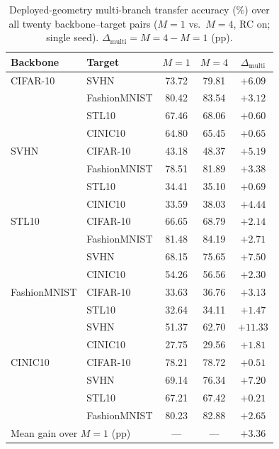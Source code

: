 \documentclass[conference]{IEEEtran}
\begin{document}
\begin{table}[!t]
\centering
\caption{Deployed-geometry multi-branch transfer accuracy (\%) over all twenty backbone--target pairs ($M{=}1$ vs.\ $M{=}4$, RC on; single seed). $\Delta_{\text{multi}} = M{=}4 - M{=}1$ (pp).}
\label{tab:mbdep}
\small
\setlength{\tabcolsep}{5pt}
\begin{tabular}{llccc}
\toprule
\textbf{Backbone} & \textbf{Target} & $M{=}1$ & $M{=}4$ & $\Delta_{\text{multi}}$ \\
\midrule
CIFAR-10 & SVHN & 73.72 & 79.81 & $+6.09$ \\
 & FashionMNIST & 80.42 & 83.54 & $+3.12$ \\
 & STL10 & 67.46 & 68.06 & $+0.60$ \\
 & CINIC10 & 64.80 & 65.45 & $+0.65$ \\
SVHN & CIFAR-10 & 43.18 & 48.37 & $+5.19$ \\
 & FashionMNIST & 78.51 & 81.89 & $+3.38$ \\
 & STL10 & 34.41 & 35.10 & $+0.69$ \\
 & CINIC10 & 33.59 & 38.03 & $+4.44$ \\
STL10 & CIFAR-10 & 66.65 & 68.79 & $+2.14$ \\
 & FashionMNIST & 81.48 & 84.19 & $+2.71$ \\
 & SVHN & 68.15 & 75.65 & $+7.50$ \\
 & CINIC10 & 54.26 & 56.56 & $+2.30$ \\
FashionMNIST & CIFAR-10 & 33.63 & 36.76 & $+3.13$ \\
 & STL10 & 32.64 & 34.11 & $+1.47$ \\
 & SVHN & 51.37 & 62.70 & $+11.33$ \\
 & CINIC10 & 27.75 & 29.56 & $+1.81$ \\
CINIC10 & CIFAR-10 & 78.21 & 78.72 & $+0.51$ \\
 & SVHN & 69.14 & 76.34 & $+7.20$ \\
 & STL10 & 67.21 & 67.42 & $+0.21$ \\
 & FashionMNIST & 80.23 & 82.88 & $+2.65$ \\
\midrule
\multicolumn{2}{l}{Mean gain over $M{=}1$ (pp)} & --- & --- & $+3.36$ \\
\bottomrule
\end{tabular}
\end{table}
\end{document}

